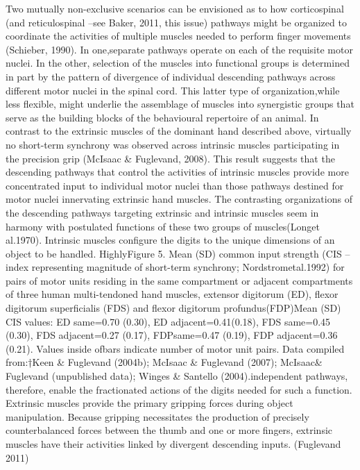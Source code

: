 {            Two mutually non-exclusive scenarios can be envisioned as to
            how corticospinal (and reticulospinal --see Baker, 2011,
            this issue) pathways might be organized to coordinate the
            activities of multiple muscles needed to perform finger
            movements (Schieber, 1990). In one,separate pathways operate
            on each of the requisite motor nuclei. In the other,
            selection of the muscles into functional groups is
            determined in part by the pattern of divergence of
            individual descending pathways across different motor nuclei
            in the spinal cord. This latter type of organization,while
            less flexible, might underlie the assemblage of muscles into
            synergistic groups that serve as the building blocks of the
            behavioural repertoire of an animal. In contrast to the
            extrinsic muscles of the dominant hand described above,
            virtually no short-term synchrony was observed across
            intrinsic muscles participating in the precision grip
            (McIsaac \& Fuglevand, 2008). This result suggests that the
            descending pathways that control the activities of intrinsic
            muscles provide more concentrated input to individual motor
            nuclei than those pathways destined for motor nuclei
            innervating extrinsic hand muscles. The contrasting
            organizations of the descending pathways targeting extrinsic
            and intrinsic muscles seem in harmony with postulated
            functions of these two groups of muscles(Longet al.1970).
            Intrinsic muscles configure the digits to the unique
            dimensions of an object to be handled. HighlyFigure 5. Mean
            (SD) common input strength (CIS -- index representing
            magnitude of short-term synchrony; Nordstrometal.1992) for
            pairs of motor units residing in the same compartment or
            adjacent compartments of three human multi-tendoned hand
            muscles, extensor digitorum (ED), flexor digitorum
            superficialis (FDS) and flexor digitorum profundus(FDP)Mean
            (SD) CIS values: ED same=0.70 (0.30), ED
            adjacent=0.41(0.18), FDS same=0.45 (0.30), FDS adjacent=0.27
            (0.17), FDPsame=0.47 (0.19), FDP adjacent=0.36 (0.21).
            Values inside ofbars indicate number of motor unit pairs.
            Data compiled from:†Keen \& Fuglevand (2004b); McIsaac \&
            Fuglevand (2007); McIsaac\& Fuglevand (unpublished data);
            Winges \& Santello (2004).independent pathways, therefore,
            enable the fractionated actions of the digits needed for
            such a function. Extrinsic muscles provide the primary
            gripping forces during object manipulation. Because gripping
            necessitates the production of precisely counterbalanced
            forces between the thumb and one or more fingers, extrinsic
            muscles have their activities linked by divergent descending
            inputs. (Fuglevand 2011)

}
